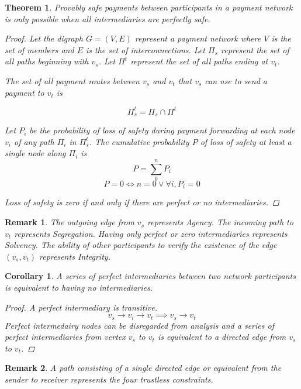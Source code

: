 \documentclass[12pt,a4paper]{article}
\begin{document}
\newtheorem{theorem}{Theorem}
\begin{theorem}
Provably safe payments between participants in a payment network is only possible when all intermediaries are perfectly safe.
\begin{proof}
Let the digraph $G=(V,E)$ represent a payment network where $V$ is the set of members and $E$ is the set of interconnections. Let $\Pi_s$ represent the set of all paths beginning with $v_s$. Let $\Pi^t$ represent the set of all paths ending at $v_t$.

The set of all payment routes between $v_s$ and $v_t$ that $v_s$ can use to send a payment to $v_t$ is

\begin{equation}
  \Pi_s^t = \Pi_s \cap \Pi^t
\end{equation}

Let $P_i$ be the probability of loss of safety during payment forwarding at each node $v_i$ of any path $\Pi_i$ in $\Pi_s^t$.
The cumulative probability $P$ of loss of safety at least a single node along $\Pi_i$ is
\begin{equation}
    P = \sum_0^n P_i
\end{equation}
\begin{equation}
    P = 0 \iff n = 0 \lor \forall i, P_i = 0
\label{T1eq1}
\end{equation}

Loss of safety is zero if and only if there are perfect or no intermediaries.
\end{proof}
\end{theorem}
\newtheorem*{remark}{Remark}
\begin{remark}{} The outgoing edge from $v_s$ represents \emph{Agency}. The incoming path to $v_t$ represents \emph{Segregation}. Having only perfect or zero intermediaries represents \emph{Solvency}. The ability of other participants to verify the existence of the edge $(v_s,v_t)$ represents \emph{Integrity}.
\end{remark}
\newtheorem{corollary}{Corollary}
\begin{corollary}
A series of perfect intermediaries between two network participants is equivalent to having no intermediaries.
\begin{proof}
A perfect intermediary is transitive.
\begin{equation}
    v_s \rightarrow v_i \rightarrow v_t \implies v_s \rightarrow v_t
\end{equation}
Perfect intermedairy nodes can be disregarded from analysis and a series of perfect intermediaries from vertex $v_s$ to $v_t$ is equivalent to a   directed edge from $v_s$ to $v_t$.
\end{proof}
\end{corollary}
\begin{remark}
A path consisting of a single directed edge or equivalent from the sender to  receiver represents the four trustless constraints.
\end{remark}
\newpage
\end{document}

